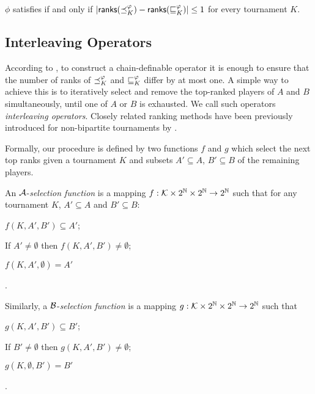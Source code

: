 \begin{theorem}
    \label{tourn_result_chain_def_ranks_characterisation}

    $\phi$ satisfies  if and only if $|\mathsf{ranks}({\preceq_K^\varphi})
    - \mathsf{ranks}({\sqsubseteq_K^\varphi})| \le 1$ for every tournament $K$.
\end{theorem}

\subsection{Interleaving Operators}
\label{tourn_sec_interleaving}

According to , to construct a
chain-definable operator it is enough to ensure that the number of ranks of
$\preceq_K^\varphi$ and $\sqsubseteq_K^\varphi$ differ by at most one. A simple way to achieve
this is to iteratively select and remove the top-ranked players of $A$ and $B$
simultaneously, until one of $A$ or $B$ is exhausted. We call such operators
\emph{interleaving operators}. Closely related ranking methods have been
previously introduced for non-bipartite tournaments by
\textcite{bouyssou2004monotonicity}.

Formally, our procedure is defined by two functions $f$ and $g$ which select
the next top ranks given a tournament $K$ and subsets $A' \subseteq A$, $B'
\subseteq B$ of the remaining players.

\begin{definition}%
    \label{tourn_def_selectionfunction}

     An $\mathcal{A}$-\emph{selection function} is a mapping $f: \mathcal{K} \times 2^{\mathbb{N}} \times
     2^{\mathbb{N}} \to 2^{\mathbb{N}}$ such that for any tournament $K$, $A' \subseteq A$ and $B'
     \subseteq B$:
    \begin{inlinelist}
        \item \label{tourn_item_f_sel_1} $f(K, A', B') \subseteq A'$;
        \item \label{tourn_item_f_sel_2} If $A' \ne \emptyset$ then $f(K, A', B') \ne
              \emptyset$;
        \item \label{tourn_item_f_sel_3} $f(K, A', \emptyset) = A'$
    \end{inlinelist}.

    Similarly, a $\mathcal{B}$-\emph{selection function} is a mapping $g: \mathcal{K} \times 2^{\mathbb{N}}
    \times 2^{\mathbb{N}} \to 2^{\mathbb{N}}$ such that
    \begin{inlinelist}
        \item \label{tourn_item_g_sel_1} $g(K, A', B') \subseteq B'$;
        \item \label{tourn_item_g_sel_2} If $B' \ne \emptyset$ then $g(K, A', B') \ne
              \emptyset$;
        \item \label{tourn_item_g_sel_3} $g(K, \emptyset, B') = B'$
    \end{inlinelist}.

\end{definition}


